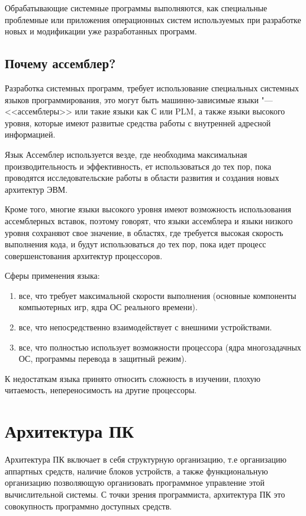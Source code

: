 Обрабатывающие системные программы выполняются, как специальные проблемные или приложения операционных систем
используемых при разработке новых и модификации уже разработанных программ.

\subsection{Почему ассемблер?}

Разработка системных программ, требует использование специальных системных языков программирования, это могут быть машинно-зависимые языки "--- <<ассемблеры>> или такие языки как С или PLM, а также языки
высокого уровня, которые имеют развитые средства работы с внутренней адресной информацией.

Язык Ассемблер используется везде, где необходима максимальная производительность и эффективность, 
ет использоваться до тех пор, пока проводятся исследовательские работы в области 
развития и создания новых архитектур ЭВМ. 

Кроме того, многие языки высокого уровня имеют возможность использования ассемблерных 
вставок, поэтому говорят, что языки ассемблера и языки низкого уровня сохраняют свое значение, в областях, 
где требуется высокая скорость выполнения кода,
и будут использоваться до тех пор, пока идет процесс совершенстования архитектур процессоров.

Сферы применения языка:
\begin{enumerate}
    \item все, что требует максимальной скорости выполнения (основные компоненты компьютерных игр, ядра ОС реального времени).
    \item все, что непосредственно взаимодействует с внешними устройствами.
    \item все, что полностью использует возможности процессора (ядра многозадачных ОС, программы перевода в защитный режим).
\end{enumerate}

К недостаткам языка принято относить сложность в изучении, плохую читаемость, непереносимость на другие процессоры.

\section{Архитектура ПК}
Архитектура ПК включает в себя структурную организацию, т.е организацию аппартных средств, 
наличие блоков устройств, а также функциональную организацию
позволяющую организовать программное управление этой вычислительной системы. 
С точки зрения программиста, архитектура ПК это совокупность программно доступных средств.

